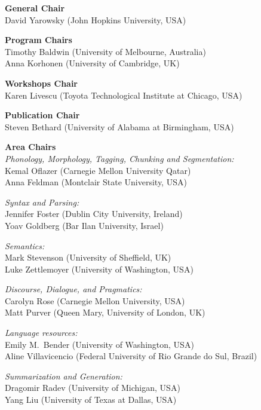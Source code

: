 \renewcommand{\leftheader}{EMNLP Organizing committee}
\renewcommand{\rightheader}{EMNLP Organizing committee}

{\small
\noindent
\textbf{General Chair}\\
David Yarowsky (John Hopkins University, USA)

\smallskip
\noindent
\textbf{Program Chairs}\\
Timothy Baldwin (University of Melbourne, Australia)\\
Anna Korhonen (University of Cambridge, UK)

\smallskip
\noindent
\textbf{Workshops Chair}\\
Karen Livescu (Toyota Technological Institute at Chicago, USA)

\smallskip
\noindent
\textbf{Publication Chair}\\
Steven Bethard (University of Alabama at Birmingham, USA)

\medskip
\noindent
\textbf{Area Chairs}\\
\textit{Phonology, Morphology, Tagging, Chunking and Segmentation:}\\
  Kemal Oflazer (Carnegie Mellon University Qatar)\\
  Anna Feldman (Montclair State University, USA)

\smallskip
\noindent
\textit{Syntax and Parsing:}\\
  Jennifer Foster (Dublin City University, Ireland)\\
  Yoav Goldberg (Bar Ilan University, Israel)

\smallskip
\noindent
\textit{Semantics:}\\
  Mark Stevenson (University of Sheffield, UK)\\
  Luke Zettlemoyer (University of Washington, USA)

\smallskip
\noindent
\textit{Discourse, Dialogue, and Pragmatics:}\\
  Carolyn Rose (Carnegie Mellon University, USA)\\
  Matt Purver (Queen Mary, University of London, UK)

\smallskip
\noindent
\textit{Language resources:}\\
  Emily M.\ Bender (University of Washington, USA)\\
  Aline Villavicencio (Federal University of Rio Grande do Sul, Brazil)

\smallskip
\noindent
\textit{Summarization and Generation:}\\
  Dragomir Radev (University of Michigan, USA)\\
  Yang Liu (University of Texas at Dallas, USA)

}
